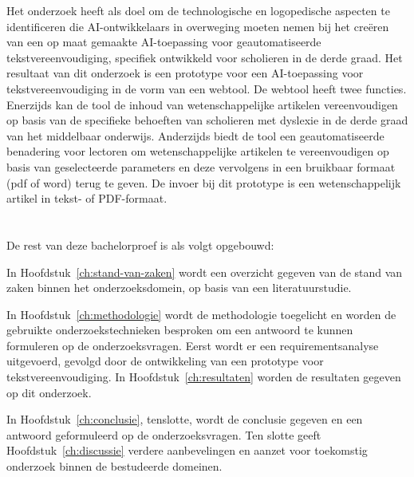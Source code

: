 Het onderzoek heeft als doel om de technologische en logopedische aspecten te identificeren die AI-ontwikkelaars in overweging moeten nemen bij het creëren van een op maat gemaakte AI-toepassing voor geautomatiseerde tekstvereenvoudiging, specifiek ontwikkeld voor scholieren in de derde graad. Het resultaat van dit onderzoek is een prototype voor een AI-toepassing voor tekstvereenvoudiging in de vorm van een webtool. De webtool heeft twee functies. Enerzijds kan de tool de inhoud van wetenschappelijke artikelen vereenvoudigen op basis van de specifieke behoeften van scholieren met dyslexie in de derde graad van het middelbaar onderwijs. Anderzijds biedt de tool een geautomatiseerde benadering voor lectoren om wetenschappelijke artikelen te vereenvoudigen op basis van geselecteerde parameters en deze vervolgens in een bruikbaar formaat (pdf of word) terug te geven. De invoer bij dit prototype is een wetenschappelijk artikel in tekst- of PDF-formaat.


\section{}%
\label{sec:opzet-bachelorproef}

De rest van deze bachelorproef is als volgt opgebouwd:

In Hoofdstuk~\ref{ch:stand-van-zaken} wordt een overzicht gegeven van de stand van zaken binnen het onderzoeksdomein, op basis van een literatuurstudie.

In Hoofdstuk~\ref{ch:methodologie} wordt de methodologie toegelicht en worden de gebruikte onderzoekstechnieken besproken om een antwoord te kunnen formuleren op de onderzoeksvragen. Eerst wordt er een requirementsanalyse uitgevoerd, gevolgd door de ontwikkeling van een prototype voor tekstvereenvoudiging. In Hoofdstuk~\ref{ch:resultaten} worden de resultaten gegeven op dit onderzoek. 

In Hoofdstuk~\ref{ch:conclusie}, tenslotte, wordt de conclusie gegeven en een antwoord geformuleerd op de onderzoeksvragen. Ten slotte geeft Hoofdstuk~\ref{ch:discussie} verdere aanbevelingen en aanzet voor toekomstig onderzoek binnen de bestudeerde domeinen. 